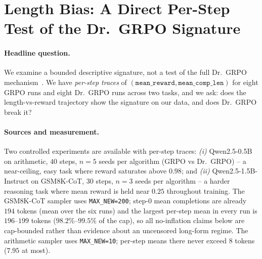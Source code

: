 \section{Length Bias: A Direct Per-Step Test of the Dr.~GRPO Signature}
\label{sec:length-bias-pillar}

\paragraph{Headline question.}
We examine a bounded descriptive signature, not a test of the full
Dr.~GRPO mechanism~\cite{tong2025drgrpo}. We have
\emph{per-step traces} of $(\texttt{mean\_reward},
\texttt{mean\_comp\_len})$ for eight GRPO runs and eight Dr.~GRPO runs
across two tasks, and we ask: does the length-vs-reward trajectory
show the signature on our data, and does Dr.~GRPO break it?

\paragraph{Sources and measurement.}
Two controlled experiments are available with per-step traces:
\emph{(i)} Qwen2.5-0.5B on arithmetic, $40$ steps, $n{=}5$ seeds per
algorithm (GRPO vs Dr.~GRPO) -- a near-ceiling, easy task where
reward saturates above $0.98$; and
\emph{(ii)} Qwen2.5-1.5B-Instruct on GSM8K-CoT, $30$ steps, $n{=}3$
seeds per algorithm -- a harder reasoning task where mean reward
is held near $0.25$ throughout training. The GSM8K-CoT sampler uses
\texttt{MAX\_NEW=200}; step-0 mean completions are already $194$ tokens
(mean over the six runs) and the largest per-step mean in every run is
$196$--$199$ tokens ($98.2\%$--$99.5\%$ of the cap), so
all no-inflation claims below are cap-bounded rather than evidence about an
uncensored long-form regime. The arithmetic sampler uses \texttt{MAX\_NEW=10};
per-step means there never exceed $8$ tokens ($7.95$ at most).


